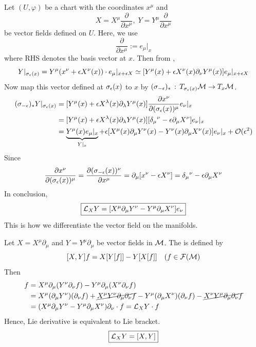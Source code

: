 \documentclass[a4paper, 10pt]{article}
\begin{document}
\begin{obs}
    Let $(U, \varphi)$ be a chart with the coordinates $x^{\mu}$ and
    \[ X = X^{\mu}\frac{\partial}{\partial{x}^{\mu}},\; Y = Y^{\mu}\frac{\partial}{\partial{x}^{\mu}} \]
    be vector fields defined on $U$. Here, we use 
    \[ \frac{\partial}{\partial{x}^{\mu}} := e_{\mu}|_{x} \]
    where RHS denotes the basis vector at $x$. Then from ,
    \[ Y|_{\sigma_{\epsilon}(x)} = Y^{\mu}(x^{\nu} + \epsilon X^{\nu}(x)) \cdot e_{\mu}|_{x+\epsilon X} \simeq [Y^{\mu}(x) + \epsilon X^{\nu}(x)\partial_{\nu}Y^{\mu}(x)] e_{\mu}|_{x+\epsilon X} \]
    Now map this vector defined at $\sigma_{\epsilon}(x)$ to $x$ by $(\sigma_{-\epsilon})_{\ast} \,:\, T_{\sigma_{\epsilon}(x)}\mathcal{M} \rightarrow T_{x}\mathcal{M}$.
    \begin{align*}
        (\sigma_{-\epsilon})_{\ast}Y|_{\sigma_{\epsilon}(x)} &= [Y^{\mu}(x) + \epsilon X^{\lambda}(x)\partial_{\lambda}Y^{\mu}(x)] \frac{\partial x^{\nu}}{\partial(\sigma_{\epsilon}(x))^{\mu}} e_{\nu}|_{x} \\
        &= [Y^{\mu}(x) + \epsilon X^{\lambda}(x)\partial_{\lambda}Y^{\mu}(x)][\delta_{\mu}{}^{\nu}-\epsilon\partial_{\mu}X^{\nu}]e_{\nu}|_{x} \\
        &= \underbrace{Y^{\mu}(x)e_{\mu}|_{x}}_{Y|_{x}} + \epsilon[X^{\mu}(x)\partial_{\mu}Y^{\nu}(x) - Y^{\nu}(x)\partial_{\mu}X^{\nu}(x)]e_{\nu}|_{x} + \mathcal{O}(\epsilon^{2})
    \end{align*}
    Since
    \[ \frac{\partial x^{\nu}}{\partial(\sigma_{\epsilon}(x))^{\mu}} = \frac{\partial(\sigma_{-\epsilon}(x))^{\nu}}{\partial x^{\mu}} = \partial_{\mu}[x^{\nu} - \epsilon X^{\nu}] = \delta_{\mu}{}^{\nu} - \epsilon\partial_{\mu}X^{\nu} \]
    In conclusion,
    \[ \boxed{\mathcal{L}_{X}Y = [X^{\mu}\partial_{\mu}Y^{\nu} - Y^{\mu}\partial_{\mu}X^{\nu}]e_{\nu}} \]
    This is how we differentiate the vector field on the manifolds.
\end{obs}

\begin{definition}
    Let $X = X^{\mu}\partial_{\mu}$ and $Y = Y^{\mu}\partial_{\mu}$ be vector fields in $\mathcal{M}$. The  is defined by
    \[ [X,Y]f = X[Y[f]] - Y[X[f]] \quad(f \in \mathcal{F}(\mathcal{M}) \]
    Then
    \begin{align*}
        [X,Y]f &= X^{\mu}\partial_{\mu}(Y^{\nu}\partial_{\nu}f) - Y^{\mu}\partial_{\mu}(X^{\nu}\partial_{\nu}f) \\
        &= X^{\mu}(\partial_{\mu}Y^{\nu})(\partial_{\nu}f) + \cancel{X^{\mu}Y^{\nu}\partial_{\mu}\partial_{\nu}f} - Y^{\mu}(\partial_{\mu}X^{\nu})(\partial_{\nu}f) - \cancel{X^{\nu}Y^{\mu}\partial_{\mu}\partial_{\nu}f} \\
        &= (X^{\mu}\partial_{\mu}Y^{\nu} - Y^{\mu}\partial_{\mu}X^{\nu})\partial_{\nu} \cdot f = \mca{L}_{X}Y\cdot f
    \end{align*}
    Hence, Lie derivative is equivalent to Lie bracket.
    \[ \boxed{\mathcal{L}_{X}Y = [X, Y]} \]
\end{definition}
\end{document}
